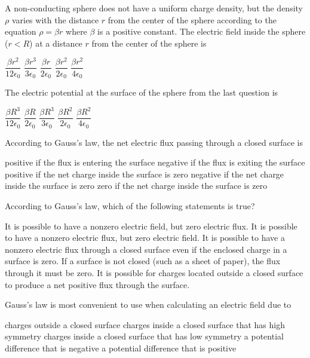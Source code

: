 \documentclass{../../oss-apphys-exam}
\begin{document}
\begin{questions}
  \question A non-conducting sphere does not have a uniform charge density,
  but the density $\rho$ varies with the distance $r$ from the center of the
  sphere according to the equation $\rho=\beta r$ where $\beta$ is a positive
  constant. The electric field inside the sphere ($r<R$) at a distance $r$
  from the center of the sphere is
  \begin{choices}
    \choice $\dfrac{\beta r^2}{12\epsilon_0}$
    \choice $\dfrac{\beta r^3}{3\epsilon_0}$
    \choice $\dfrac{\beta r}{2\epsilon_0}$
    \choice $\dfrac{\beta r^2}{2\epsilon_0}$
    \choice $\dfrac{\beta r^2}{4\epsilon_0}$
  \end{choices}
 
  \question The electric potential at the surface of the sphere from the last
  question is
  \begin{choices}
    \choice $\dfrac{\beta R^3}{12\epsilon_0}$
    \choice $\dfrac{\beta R}{2\epsilon_0}$
    \choice $\dfrac{\beta R^3}{3\epsilon_0}$
    \choice $\dfrac{\beta R^2}{2\epsilon_0}$
    \choice $\dfrac{\beta R^2}{4\epsilon_0}$
  \end{choices}
   
  \question According to Gauss's law, the net electric flux passing through a
  closed surface is
  \begin{choices}
    \choice positive if the flux is entering the surface
    \choice negative if the flux is exiting the surface
    \choice positive if the net charge inside the surface is zero
    \choice negative if the net charge inside the surface is zero
    \choice zero if the net charge inside the surface is zero
  \end{choices}
   
  \question According to Gauss's law, which of the following statements is
  true?
  \begin{choices}
    \choice It is possible to have a nonzero electric field, but zero electric
    flux.
    \choice It is possible to have a nonzero electric flux, but zero electric
    field.
    \choice It is possible to have a nonzero electric flux through a closed
    surface even if the enclosed charge in a surface is zero.
    \choice If a surface is not closed (such as a sheet of paper), the flux
    through it must be zero.
    \choice It is possible for charges located outside a closed surface to
    produce a net positive flux through the surface.
  \end{choices}
   
  \question Gauss's law is most convenient to use when calculating an electric
  field due to
  \begin{choices}
    \choice charges outside a closed surface
    \choice charges inside a closed surface that has high symmetry
    \choice charges inside a closed surface that has low symmetry
    \choice a potential difference that is negative
    \choice a potential difference that is positive
  \end{choices}


\end{questions}
\end{document}
